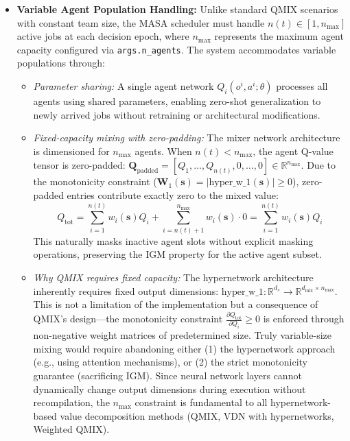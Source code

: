 \begin{itemize}
\item \textbf{Variable Agent Population Handling:} Unlike standard QMIX scenarios with constant team size, the MASA scheduler must handle \(n(t) \in [1, n_{\max}]\) active jobs at each decision epoch, where \(n_{\max}\) represents the maximum agent capacity configured via \texttt{args.n\_agents}. The system accommodates variable populations through:
\begin{itemize}
    \item \textit{Parameter sharing:} A single agent network \(Q_i(o^i, a^i; \theta)\) processes all agents using shared parameters, enabling zero-shot generalization to newly arrived jobs without retraining or architectural modifications.
    
    \item \textit{Fixed-capacity mixing with zero-padding:} The mixer network architecture is dimensioned for \(n_{\max}\) agents. When \(n(t) < n_{\max}\), the agent Q-value tensor is zero-padded: \(\mathbf{Q}_{\text{padded}} = [Q_1, \ldots, Q_{n(t)}, 0, \ldots, 0] \in \mathbb{R}^{n_{\max}}\). Due to the monotonicity constraint (\(\mathbf{W}_1(\mathbf{s}) = |\text{hyper\_w\_1}(\mathbf{s})| \geq 0\)), zero-padded entries contribute exactly zero to the mixed value:
    \[
    Q_{\text{tot}} = \sum_{i=1}^{n(t)} w_i(\mathbf{s}) Q_i + \sum_{i=n(t)+1}^{n_{\max}} w_i(\mathbf{s}) \cdot 0 = \sum_{i=1}^{n(t)} w_i(\mathbf{s}) Q_i
    \]
    This naturally masks inactive agent slots without explicit masking operations, preserving the IGM property for the active agent subset.
    
    \item \textit{Why QMIX requires fixed capacity:} The hypernetwork architecture inherently requires fixed output dimensions: \(\text{hyper\_w\_1}: \mathbb{R}^{d_s} \rightarrow \mathbb{R}^{d_{\text{mix}} \times n_{\max}}\). This is not a limitation of the implementation but a consequence of QMIX's design—the monotonicity constraint \(\frac{\partial Q_{\text{tot}}}{\partial Q_i} \geq 0\) is enforced through non-negative weight matrices of predetermined size. Truly variable-size mixing would require abandoning either (1) the hypernetwork approach (e.g., using attention mechanisms), or (2) the strict monotonicity guarantee (sacrificing IGM). Since neural network layers cannot dynamically change output dimensions during execution without recompilation, the \(n_{\max}\) constraint is fundamental to all hypernetwork-based value decomposition methods (QMIX, VDN with hypernetworks, Weighted QMIX).
    

\end{itemize}
\end{itemize}
